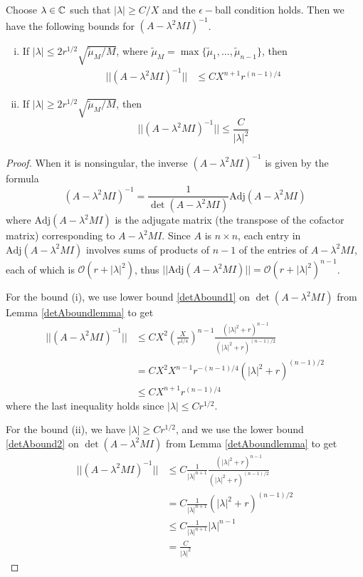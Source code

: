 \documentclass[thesis.tex]{subfiles}
\begin{document}
\begin{lemma}\label{Ainvboundlemma}
Choose $\lambda \in \mathbb{C}$ such that $|\lambda| \geq C/X$ and the $\epsilon-$ball condition holds. Then we have the following bounds for $(A - \lambda^2 M I)^{-1}$.
\begin{enumerate}[(i)]
\item If $|\lambda| \leq 2 r^{1/2} \sqrt{\tilde{\mu}_M/M}$, where $\tilde{\mu}_M = \max\{\tilde{\mu}_1, \dots, \tilde{\mu}_{n-1}\}$, then
\begin{align}\label{Ainvbound1}
||(A - \lambda^2 M I)^{-1}|| &\leq C X ^{n+1} r^{(n-1)/4}
\end{align}

\item If $|\lambda| \geq 2 r^{1/2} \sqrt{\tilde{\mu}_M/M}$, then
\begin{equation}\label{Ainvbound2}
||(A - \lambda^2 M I)^{-1}|| \leq \frac{C}{|\lambda|^2}
\end{equation}
\end{enumerate}
\begin{proof}
When it is nonsingular, the inverse $(A - \lambda^2 M I)^{-1}$ is given by the formula
\[
(A - \lambda^2 M I)^{-1} = \frac{1}{\det(A - \lambda^2 M I)}\text{Adj}(A - \lambda^2 M I)
\]
where $\text{Adj}(A - \lambda^2 M I)$ is the adjugate matrix (the transpose of the cofactor matrix) corresponding to $A - \lambda^2 M I$. Since $A$ is $n \times n$, each entry in $\text{Adj}(A - \lambda^2 M I)$ involves sums of products of $n-1$ of the entries of $A - \lambda^2 M I$, each of which is $\mathcal{O}(r + |\lambda|^2)$, thus $||\text{Adj}(A - \lambda^2 M I)|| = \mathcal{O}(r + |\lambda|^2)^{n-1}$.

For the bound (i), we use lower bound \eqref{detAbound1} on $\det(A - \lambda^2 M I)$ from Lemma \ref{detAboundlemma} to get
\begin{align*}
||(A - \lambda^2 M I)^{-1}|| &\leq C X^2 \left(\frac{X}{r^{1/4}}\right)^{n-1} 
\frac{\left( |\lambda|^2 + r \right)^{n-1}}{\left( |\lambda|^2 + r \right)^{(n-1)/2}} \\
&= C X^2 X^{n - 1} r^{-(n-1)/4}\left( |\lambda|^2 + r \right)^{(n-1)/2} \\
&\leq C X ^{n+1} r^{(n-1)/4}
\end{align*}
where the last inequality holds since $|\lambda| \leq C r^{1/2}$.

For the bound (ii), we have $|\lambda| \geq C r^{1/2}$, and we use the lower bound \eqref{detAbound2} on $\det(A - \lambda^2 M I)$ from Lemma \ref{detAboundlemma} to get
\begin{align*}
||(A - \lambda^2 M I)^{-1}|| &\leq C \frac{1}{|\lambda|^{n+1}} 
\frac{\left( |\lambda|^2 + r \right)^{n-1}}{\left( |\lambda|^2 + r \right)^{(n-1)/2}} \\
&= C \frac{1}{|\lambda|^{n+1}} \left( |\lambda|^2 + r \right)^{(n-1)/2} \\
&\leq C \frac{1}{|\lambda|^{n+1}} |\lambda|^{n-1} \\
&=\frac{C}{|\lambda|^2}
\end{align*}
\end{proof}
\end{lemma}
\end{document}
